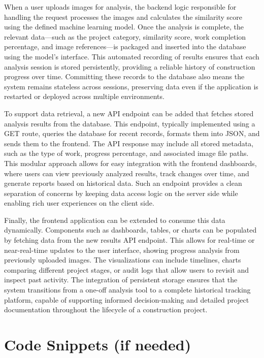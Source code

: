 \documentclass[12pt,a4paper]{report}
\begin{document}
When a user uploads images for analysis, the backend logic responsible for handling the request processes the images and calculates the similarity score using the defined machine learning model. Once the analysis is complete, the relevant data—such as the project category, similarity score, work completion percentage, and image references—is packaged and inserted into the database using the model's interface. This automated recording of results ensures that each analysis session is stored persistently, providing a reliable history of construction progress over time. Committing these records to the database also means the system remains stateless across sessions, preserving data even if the application is restarted or deployed across multiple environments.

To support data retrieval, a new API endpoint can be added that fetches stored analysis results from the database. This endpoint, typically implemented using a GET route, queries the database for recent records, formats them into JSON, and sends them to the frontend. The API response may include all stored metadata, such as the type of work, progress percentage, and associated image file paths. This modular approach allows for easy integration with the frontend dashboards, where users can view previously analyzed results, track changes over time, and generate reports based on historical data. Such an endpoint provides a clean separation of concerns by keeping data access logic on the server side while enabling rich user experiences on the client side.

Finally, the frontend application can be extended to consume this data dynamically. Components such as dashboards, tables, or charts can be populated by fetching data from the new results API endpoint. This allows for real-time or near-real-time updates to the user interface, showing progress analysis from previously uploaded images. The visualizations can include timelines, charts comparing different project stages, or audit logs that allow users to revisit and inspect past activity. The integration of persistent storage ensures that the system transitions from a one-off analysis tool to a complete historical tracking platform, capable of supporting informed decision-making and detailed project documentation throughout the lifecycle of a construction project.

\setlength{\baselineskip}{1.0\baselineskip}

\section{Code Snippets (if needed)}
\end{document}
